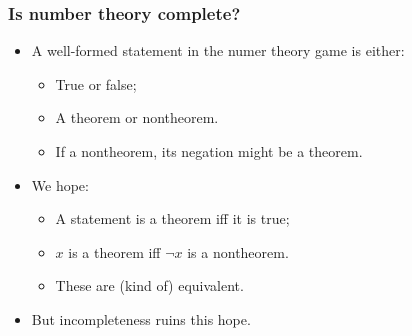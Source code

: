 \documentclass[mathserif]{beamer}
\begin{document}
\begin{frame}
\frametitle{Is number theory complete?}
\label{sec-2-5}

\pause
\begin{itemize}

\item A well-formed statement in the numer theory game is either:\pause
\label{sec-2-5-1}%
\begin{itemize}

\item True or false;\pause\\
\label{sec-2-5-1-1}%
\item A theorem or nontheorem.\pause\\
\label{sec-2-5-1-2}%
\item If a nontheorem, its negation might be a theorem.\pause\\
\label{sec-2-5-1-3}%
\end{itemize} %

\item We hope:\pause
\label{sec-2-5-2}%
\begin{itemize}

\item A statement is a theorem iff it is true;\pause\\
\label{sec-2-5-2-1}%
\item $x$ is a theorem iff $¬x$ is a nontheorem.\pause\\
\label{sec-2-5-2-2}%
\item These are (kind of) equivalent.\pause\\
\label{sec-2-5-2-3}%
\end{itemize} %

\item But incompleteness ruins this hope.\\
\label{sec-2-5-3}%
\end{itemize} %
\end{frame}
\end{document}
